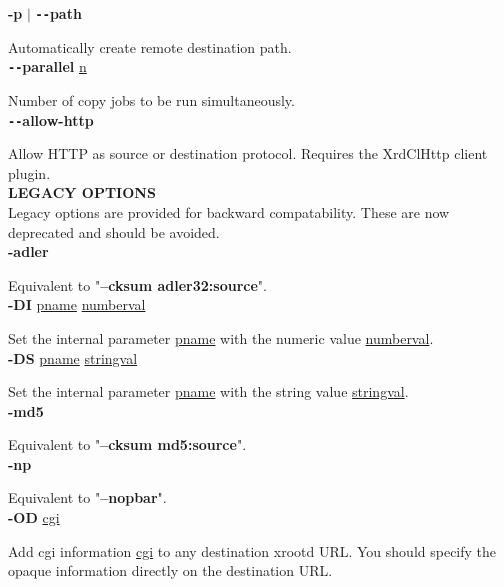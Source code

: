 \documentclass{article}
\begin{document}
		\noindent \textbf{-p} $\vert$ \textbf{\texttt{-{}-}path}

		\noindent Automatically create remote destination path. \\
		
		\noindent \textbf{\texttt{-{}-}parallel} \underline{n}

		\noindent Number of copy jobs to be run simultaneously. \\
		
		\noindent \textbf{\texttt{-{}-}allow-http}

		\noindent Allow HTTP as source or destination protocol. Requires the XrdClHttp client plugin. \\
		
		\noindent \textbf{LEGACY OPTIONS} \\
		
		\noindent Legacy options are provided for backward compatability. These are now
		deprecated and should be avoided. \\
		
		\noindent \textbf{-adler}

		\noindent Equivalent to "\textbf{--cksum adler32:source}". \\
		
		\noindent \textbf{-DI} \underline{pname} \underline{numberval}

		\noindent Set the internal parameter \underline{pname} with the numeric value \underline{numberval}. \\
		
		\noindent \textbf{-DS} \underline{pname} \underline{stringval}

		\noindent Set the internal parameter \underline{pname} with the string value \underline{stringval}. \\
		
		\noindent \textbf{-md5}

		\noindent Equivalent to "\textbf{--cksum md5:source}". \\
		
		\noindent \textbf{-np}

		\noindent Equivalent to "\textbf{--nopbar}". \\
		
		\noindent \textbf{-OD} \underline{cgi}

		\noindent Add cgi information \underline{cgi} to any destination xrootd URL.
		You should specify the opaque information directly on the destination URL. \\
		
\end{document}
